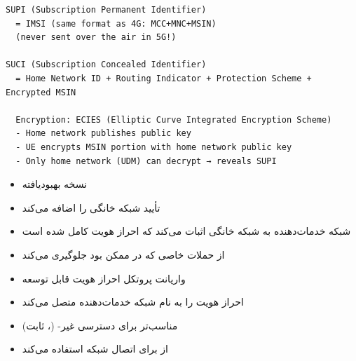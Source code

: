 
\def\CNcodelang{}

\begin{CNplaincode}
\begin{Verbatim}
SUPI (Subscription Permanent Identifier)
  = IMSI (same format as 4G: MCC+MNC+MSIN)
  (never sent over the air in 5G!)

SUCI (Subscription Concealed Identifier)
  = Home Network ID + Routing Indicator + Protection Scheme + Encrypted MSIN
  
  Encryption: ECIES (Elliptic Curve Integrated Encryption Scheme)
  - Home network publishes public key
  - UE encrypts MSIN portion with home network public key
  - Only home network (UDM) can decrypt → reveals SUPI
\end{Verbatim}
\end{CNplaincode}



\begin{itemize}
\tightlist
\item
  نسخه بهبودیافته 
\item
  تأیید شبکه خانگی را اضافه می‌کند 
\item
  شبکه خدمات‌دهنده به شبکه خانگی اثبات می‌کند که احراز هویت کامل شده است
\item
  از حملات  خاصی که در  ممکن بود جلوگیری می‌کند
\end{itemize}


\begin{itemize}
\tightlist
\item
  واریانت پروتکل احراز هویت قابل توسعه
\item
  احراز هویت را به نام شبکه خدمات‌دهنده متصل می‌کند
\item
  مناسب‌تر برای دسترسی غیر- (، ثابت)
\item
  از  برای اتصال شبکه استفاده می‌کند
\end{itemize}



